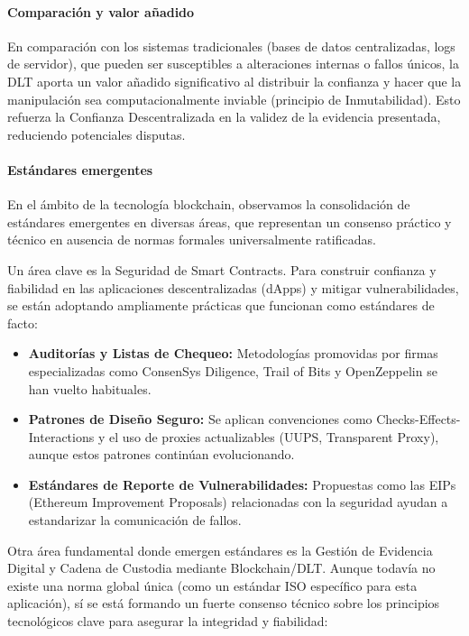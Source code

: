 \paragraph{Comparación y valor añadido} En comparación con los sistemas tradicionales (bases de datos centralizadas, logs de servidor), que pueden ser susceptibles a alteraciones internas o fallos únicos, la DLT aporta un valor añadido significativo al distribuir la confianza y hacer que la manipulación sea computacionalmente inviable (principio de Inmutabilidad). Esto refuerza la Confianza Descentralizada en la validez de la evidencia presentada, reduciendo potenciales disputas. 

\paragraph{Estándares emergentes} En el ámbito de la tecnología blockchain, observamos la consolidación de estándares emergentes en diversas áreas, que representan un consenso práctico y técnico en ausencia de normas formales universalmente ratificadas. 

Un área clave es la Seguridad de Smart Contracts. Para construir confianza y fiabilidad en las aplicaciones descentralizadas (dApps) y mitigar vulnerabilidades, se están adoptando ampliamente prácticas que funcionan como estándares de facto: 
\begin{itemize}
    \item \textbf{Auditorías y Listas de Chequeo:} Metodologías promovidas por firmas especializadas como ConsenSys Diligence, Trail of Bits y OpenZeppelin se han vuelto habituales. 
    \item \textbf{Patrones de Diseño Seguro:} Se aplican convenciones como Checks-Effects-Interactions y el uso de proxies actualizables (UUPS, Transparent Proxy), aunque estos patrones continúan evolucionando. 
    \item \textbf{Estándares de Reporte de Vulnerabilidades:} Propuestas como las EIPs (Ethereum Improvement Proposals) relacionadas con la seguridad ayudan a estandarizar la comunicación de fallos.
\end{itemize}

Otra área fundamental donde emergen estándares es la Gestión de Evidencia Digital y Cadena de Custodia mediante Blockchain/DLT. Aunque todavía no existe una norma global única (como un estándar ISO específico para esta aplicación), sí se está formando un fuerte consenso técnico sobre los principios tecnológicos clave para asegurar la integridad y fiabilidad:

